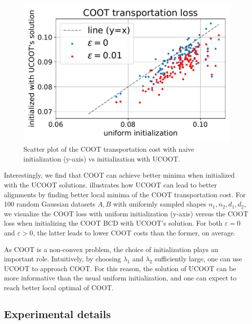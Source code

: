 \setlength{\intextsep}{0pt}
\begin{figure}
  \centering
  \vspace{-15pt}
  \includegraphics[width=\linewidth]{./Chapitre3/fig/init.pdf}
  \vspace*{-10mm}
  \caption{Scatter plot of the COOT transportation cost with naive initialization (y-axis)
  vs initialization with UCOOT.
  \label{fig:init}}
\end{figure}
Interestingly, we find that COOT can achieve better minima when initialized with the UCOOT solutions.
 illustrates how UCOOT can lead to better alignments by finding
better local minima of the COOT transportation cost. For 100 random Gaussian datasets
$A, B$ with uniformly sampled shapes $n_1, n_2, d_1, d_2$, we visualize the COOT loss
with uniform initialization (y-axis) versus the COOT loss when initializing the COOT BCD
with UCOOT's solution. For both $\varepsilon = 0$ and $\varepsilon > 0$,
the latter leads to lower COOT costs than the former, on average.

As COOT is a non-convex problem, the choice of initialization plays an important role.
Intuitively, by choosing $\lambda_1$ and $\lambda_2$ sufficiently large,
one can use UCOOT to approach COOT. For this reason, the solution of UCOOT can be more informative
than the usual uniform initialization, and one can expect to reach better local optimal of COOT.

\subsection{Experimental details} \label{sec_app:exp}

